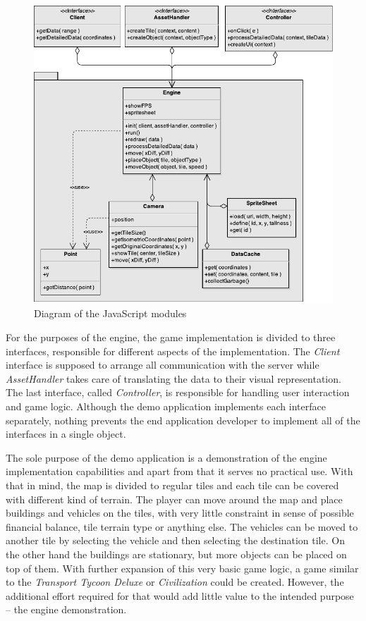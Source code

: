 \documentclass[11pt,oneside, final]{fithesis2}
\begin{document}
\begin{figure}[h]
	\centering
	\includegraphics[width=\textwidth]{thesis-classdiagram}
	\caption{Diagram of the JavaScript modules}
	\label{classdiagram}
\end{figure}

For the purposes of the engine, the game implementation is divided to three interfaces, responsible for different aspects of the implementation. The \emph{Client} interface is supposed to arrange all communication with the server while \emph{AssetHandler} takes care of translating the data to their visual representation. The last interface, called \emph{Controller}, is responsible for handling user interaction and game logic. Although the demo application implements each interface separately, nothing prevents the end application developer to implement all of the interfaces in a single object.

The sole purpose of the demo application is a demonstration of the engine implementation capabilities and apart from that it serves no practical use. With that in mind, the map is divided to regular tiles and each tile can be covered with different kind of terrain. The player can move around the map and place buildings and vehicles on the tiles, with very little constraint in sense of possible financial balance, tile terrain type or anything else. The vehicles can be moved to another tile by selecting the vehicle and then selecting the destination tile. On the other hand the buildings are stationary, but more objects can be placed on top of them. With further expansion of this very basic game logic, a game similar to the \emph{Transport Tycoon Deluxe} or \emph{Civilization} could be created. However, the additional effort required for that would add little value to the intended purpose -- the engine demonstration.
\end{document}
